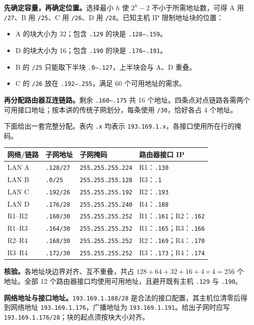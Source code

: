 \begin{checkedsolution}
\textbf{先确定容量，再确定位置。}选择最小 $h$ 使 $2^h-2$ 不小于所需地址数，可得 A 用 \texttt{/27}、B 用 \texttt{/25}、C 用 \texttt{/26}、D 用 \texttt{/28}。已知主机 IP 限制地址块的位置：
\begin{itemize}
  \item A 的块大小为 32；包含 \texttt{.129} 的块是 \texttt{.128--.159}。
  \item D 的块大小为 16；包含 \texttt{.190} 的块是 \texttt{.176--.191}。
  \item B 的 \texttt{/25} 只能取下半块 \texttt{.0--.127}，上半块会与 A、D 重叠。
  \item C 的 \texttt{/26} 放在 \texttt{.192--.255}，满足 60 个可用地址的需求。
\end{itemize}

\textbf{再分配路由器互连链路。}剩余 \texttt{.160--.175} 共 16 个地址。四条点对点链路各需两个可用接口地址；按本讲的传统子网划分，每条使用 \texttt{/30}，恰好各占 4 个地址。

下面给出一套完整分配。表内 \texttt{.x} 均表示 \texttt{193.169.1.x}，各接口使用所在行的掩码。

\begin{center}
\small
\begin{tabularx}{\textwidth}{@{}l l l X@{}}
\toprule
网络/链路 & 子网地址 & 子网掩码 & 路由器接口 IP \\
\midrule
LAN A & \texttt{.128/27} & \texttt{255.255.255.224} & R1：\texttt{.130} \\
LAN B & \texttt{.0/25} & \texttt{255.255.255.128} & R3：\texttt{.1} \\
LAN C & \texttt{.192/26} & \texttt{255.255.255.192} & R2：\texttt{.193} \\
LAN D & \texttt{.176/28} & \texttt{255.255.255.240} & R4：\texttt{.188} \\
R1--R2 & \texttt{.160/30} & \texttt{255.255.255.252} & R1：\texttt{.161}；R2：\texttt{.162} \\
R1--R3 & \texttt{.164/30} & \texttt{255.255.255.252} & R1：\texttt{.165}；R3：\texttt{.166} \\
R2--R4 & \texttt{.168/30} & \texttt{255.255.255.252} & R2：\texttt{.169}；R4：\texttt{.170} \\
R3--R4 & \texttt{.172/30} & \texttt{255.255.255.252} & R3：\texttt{.173}；R4：\texttt{.174} \\
\bottomrule
\end{tabularx}
\end{center}

\textbf{核验。}各地址块边界对齐、互不重叠，共占 $128+64+32+16+4\times4=256$ 个地址。全部 12 个路由器接口均使用可用地址，且避开既有主机 \texttt{.129} 与 \texttt{.190}。

\textbf{网络地址与接口地址。}\texttt{193.169.1.188/28} 是合法的接口配置，其主机位清零后得到网络地址 \texttt{193.169.1.176}，广播地址为 \texttt{193.169.1.191}。给出子网时应写 \texttt{193.169.1.176/28}；块的起点须按块大小对齐。
\end{checkedsolution}

